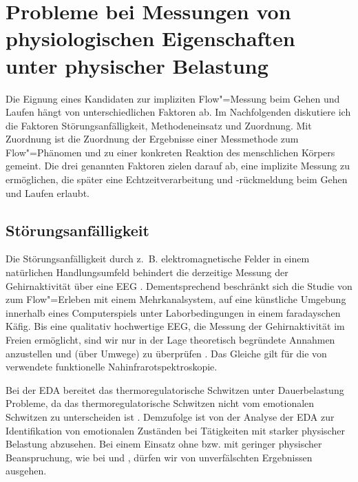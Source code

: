 

\section{Probleme bei Messungen von physiologischen Eigenschaften unter physischer Belastung} 

\label{sec:probleme_bei_messungen}

Die Eignung eines Kandidaten zur impliziten Flow"=Messung beim Gehen und Laufen hängt von unterschiedlichen Faktoren ab. Im Nachfolgenden diskutiere ich die Faktoren Störungsanfälligkeit, Methodeneinsatz und Zuordnung. Mit Zuordnung ist die Zuordnung der Ergebnisse einer Messmethode zum Flow"=Phänomen und zu einer konkreten Reaktion des menschlichen Körpers gemeint. Die drei genannten Faktoren zielen darauf ab, eine implizite Messung zu ermöglichen, die später eine Echtzeitverarbeitung und -rückmeldung beim Gehen und Laufen erlaubt.

\subsection{Störungsanfälligkeit} 

\label{sub:storungsanfalligkeit}

Die Störungsanfälligkeit durch z.~B. elektromagnetische Felder in einem natürlichen Handlungsumfeld behindert die derzeitige Messung der Gehirnaktivität über eine \acs{EEG} \citep[][S.~56]{Henk2014}. Dementsprechend beschränkt sich die Studie von \citet{Hugentobler2011} zum Flow"=Erleben mit einem Mehrkanalsystem, auf eine künstliche Umgebung innerhalb eines Computerspiels unter Laborbedingungen in einem faradayschen Käfig. Bis eine qualitativ hochwertige \acs{EEG}, die Messung der Gehirnaktivität im Freien ermöglicht, sind wir nur in der Lage theoretisch begründete Annahmen anzustellen und (über Umwege) zu überprüfen \citep[][S.~56]{Henk2014}. Das Gleiche gilt für die von \citet{Harmat2015} verwendete funktionelle Nahinfrarotspektroskopie.

Bei der \ac{EDA} bereitet das thermoregulatorische Schwitzen unter Dauerbelastung Probleme, da das thermoregulatorische Schwitzen nicht vom emotionalen Schwitzen zu unterscheiden ist \citep{Baumeister2009}. Demzufolge ist von der Analyse der \ac{EDA} zur Identifikation von emotionalen Zuständen bei Tätigkeiten mit starker physischer Belastung abzusehen. Bei einem Einsatz ohne bzw. mit geringer physischer Beanspruchung, wie bei \citet{Kivikangas2006} und \citet{Nacke2008}, dürfen wir von unverfälschten Ergebnissen ausgehen.

